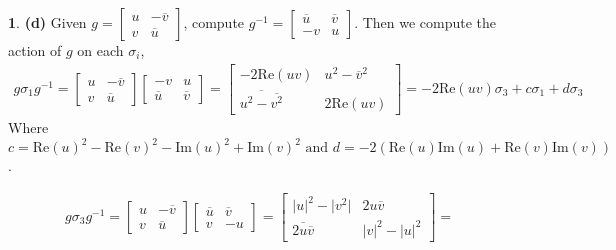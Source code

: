 \documentclass[10.5pt]{article}
\theoremstyle{definition}
\newtheorem{pb}{}
\newcommand{\abs}[1]{\lvert#1\rvert}
\newcommand{\tand}{\text{ and }}
\begin{document}
\begin{pb}
        \textbf{(d)} Given \(g = \begin{bmatrix} u & -\overline{v} \\ v & \overline{u} \end{bmatrix}\), compute \(g^{-1} = \begin{bmatrix} \overline{u} & \overline{v} \\ -v & u \end{bmatrix}\).
        Then we compute the action of \(g\) on each \(\sigma_i\),
        \begin{align*}
            g \sigma_1 g^{-1} = \begin{bmatrix} u & -\overline{v} \\ v & \overline{u} \end{bmatrix}\begin{bmatrix} -v & u \\ \overline{u} & \overline{v} \end{bmatrix} = 
            \begin{bmatrix} -2\text{Re}(uv) & u^2 - \overline{v}^2 \\ \overline{u^2 - \overline{v^2}} & 2\text{Re}(uv) \end{bmatrix} = -2\text{Re}(uv) \sigma_3 + c \sigma_1 + d \sigma_3
        \end{align*}
        Where \(c = \text{Re}(u)^2 - \text{Re}(v)^2 - \text{Im}(u)^2 + \text{Im}(v)^2 \tand d = -2(\text{Re}(u)\text{Im}(u) + \text{Re}(v)\text{Im}(v))\).

        \begin{align*}
            g \sigma_3 g^{-1} = \begin{bmatrix} u & -\overline{v} \\ v & \overline{u} \end{bmatrix}\begin{bmatrix} \overline{u} & \overline{v} \\ v & -u \end{bmatrix} = 
            \begin{bmatrix} \abs{u}^2 - \abs{v^2} & 2u \overline{v} \\ \overline{2u \overline{v}} & \abs{v}^2 - \abs{u}^2 \end{bmatrix} =
        \end{align*}

    \end{pb}
\end{document}
